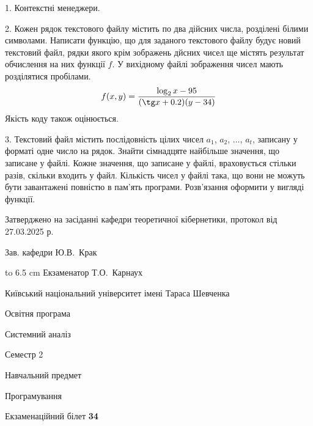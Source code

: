 \documentclass[12pt, ukrainian]{article}
\begin{document}
{%
1. Контекстні менеджери.%
\par
\vspace{2mm}

2. Кожен рядок текстового файлу містить по два дійсних числа, розділені білими символами.
Написати функцію, що для заданого текстового файлу будує новий текстовий файл, рядки якого крім зображень дйсних чисел ще містять результат обчислення на них функції $f$. У вихідному файлі зображення чисел мають розділятися пробілами. 
$$f(x, y) =\frac{\log_{2} x - 95}{(\tg x + 0.2) (y - 34)}$$ 
Якість коду також оцінюється.

\par
\vspace{2mm}

3. Текстовий файл містить послідовність цілих чисел $a_1$, $a_2$, $\ldots$, $a_t$, записану у форматі одне число на рядок. Знайти сімнадцяте найбільше значення, що записане у файлі. Кожне значення, що записане у файлі, враховується стільки разів, скільки входить у файл. Кількість чисел у файлі така, що вони не можуть бути завантажені повністю в пам'ять програми. Розв'язання оформити у вигляді функції.

}
{\smallskip\smallskip \begin {scriptsize} Затверджено на засіданні кафедри теоретичної кібернетики, протокол   від   27.03.2025 р.\par\smallskip\smallskip\smallskip\smallskip
{\parbox {6.5 cm} {Зав. кафедри \dotfill Ю.В.~Крак}}\hspace {0.7cm} {\hbox to 6.5 cm { Екзаменатор \dotfill Т.О.~Карнаух}} \end{scriptsize}}
\vspace{2.9cm}
{{\begin {scriptsize}\par
{ \center  Київський національний університет імені Тараса Шевченка \par}
{\parbox {5 cm}{Освітня програма \hfill}{\parbox {7 cm}{Системний аналіз\hfill}}\parbox {6 cm}{\hfill Семестр 2}}\par
{\parbox {5 cm} {Навчальний предмет \hfill}\parbox {7 cm}{Програмування \hfill}\parbox {6cm}{\hfill}\par}\vspace{-15pt} \end{scriptsize}}{\center Екзаменаційний білет \No \textbf { 34 }\par}}
\end{document}
